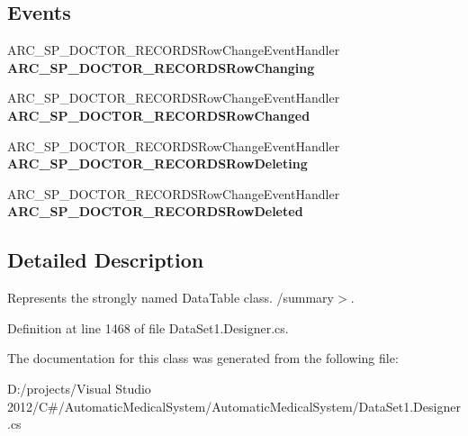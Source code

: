\subsection*{Events}
\begin{CompactItemize}
\item 
ARC\_\-SP\_\-DOCTOR\_\-RECORDSRowChangeEventHandler \textbf{ARC\_\-SP\_\-DOCTOR\_\-RECORDSRowChanging}\label{class_automatic_medical_system_1_1_data_set1_1_1_a_r_c___s_p___d_o_c_t_o_r___r_e_c_o_r_d_s_data_table_8c327c65eb5664deebe8bd7ce5260475}

\item 
ARC\_\-SP\_\-DOCTOR\_\-RECORDSRowChangeEventHandler \textbf{ARC\_\-SP\_\-DOCTOR\_\-RECORDSRowChanged}\label{class_automatic_medical_system_1_1_data_set1_1_1_a_r_c___s_p___d_o_c_t_o_r___r_e_c_o_r_d_s_data_table_8049078d8394b53b2f7008059987f58b}

\item 
ARC\_\-SP\_\-DOCTOR\_\-RECORDSRowChangeEventHandler \textbf{ARC\_\-SP\_\-DOCTOR\_\-RECORDSRowDeleting}\label{class_automatic_medical_system_1_1_data_set1_1_1_a_r_c___s_p___d_o_c_t_o_r___r_e_c_o_r_d_s_data_table_6b80b856ee300cf199456dda471718eb}

\item 
ARC\_\-SP\_\-DOCTOR\_\-RECORDSRowChangeEventHandler \textbf{ARC\_\-SP\_\-DOCTOR\_\-RECORDSRowDeleted}\label{class_automatic_medical_system_1_1_data_set1_1_1_a_r_c___s_p___d_o_c_t_o_r___r_e_c_o_r_d_s_data_table_7ea23fa05db83a122e1bf36563ba7c65}

\end{CompactItemize}


\subsection{Detailed Description}
Represents the strongly named DataTable class. /summary$>$. 

Definition at line 1468 of file DataSet1.Designer.cs.

The documentation for this class was generated from the following file:\begin{CompactItemize}
\item 
D:/projects/Visual Studio 2012/C\#/AutomaticMedicalSystem/AutomaticMedicalSystem/DataSet1.Designer.cs\end{CompactItemize}
